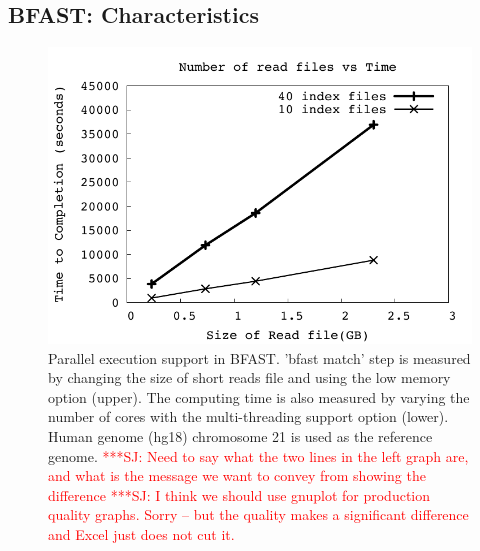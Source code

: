 \documentclass[12pt]{article}
\newcommand{\jhanote}[1]{ {\textcolor{red}     {***SJ: #1}}}
\newcommand{\jhanote}[1]{}
\begin{document}


\subsection{BFAST: Characteristics}

\begin{figure}
 \centering
\includegraphics[scale=0.66]{figures/readsvstime.pdf}

\caption{\small Parallel execution support in BFAST.  'bfast match' step is measured by changing the size of short reads file and using the low memory option (upper).  The computing time is also measured by varying the number of cores with the multi-threading support option (lower).  Human genome (hg18) chromosome 21 is used as the reference genome. \jhanote{Need to say what the two lines in the left graph are, and what is the message we want to convey from showing the difference} \jhanote{I think we should use gnuplot for production quality graphs. Sorry -- but the quality makes a significant difference and Excel just does not cut it.}}
  \label{fig:parallel-execution} 
 \end{figure}
\end{document}
